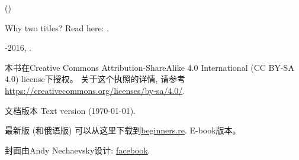 \documentclass[UTF8,nofonts]{ctexart}
\begin{document}

\begin{titlepage}


\end{titlepage}

\newpage

\begin{center}
\vspace*{\fill}
{\LARGE \TitleMain}

\bigskip

{\large (\TitleAux)}

\bigskip
\bigskip
Why two titles? Read here: . %

\vspace*{\fill}

{\large \AUTHOR}

{\large \TT{<\EMAIL>}}
\vspace*{\fill}
\vfill

\ccbysa

-2016, \AUTHOR. 

本书在Creative Commons Attribution-ShareAlike 4.0 International (CC BY-SA 4.0) license下授权。
关于这个执照的详情, 请参考\url{https://creativecommons.org/licenses/by-sa/4.0/}.

文档版本 Text version ({\large \today}).

最新版 (和俄语版) 可以从这里下载到\href{http://go.yurichev.com/17009}{beginners.re}.
E-book版本。

封面由Andy Nechaevsky设计: \href{http://go.yurichev.com/17023}{facebook}.

\end{center}
\end{document}
